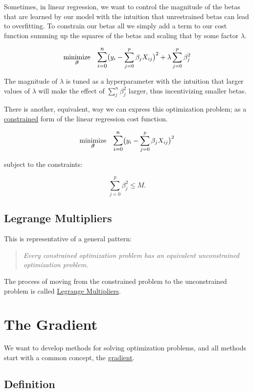 \documentclass[a4paper, 12pt]{article}
\begin{document}
Sometimes, in linear regression, we want to control the magnitude of the betas that are learned by our model with the intuition that unrestrained betas can lead to overfitting. To constrain our betas all we simply add a term to our cost function summing up the squares of the betas and scaling that by some factor $\lambda$.

    $$ \underset{\bm{\beta}}{\text{minimize}} \quad \mathlarger{\sum_{i=0}^n}
       \big(y_i - \sum_{j=0}^p \beta_j X_{ij} \big)^2 + \lambda \sum_{j=0}^p \beta_j^2 $$

The magnitude of $\lambda$ is tuned as a hyperparameter with the intuition that larger values of $\lambda$ will make the effect of $\sum_j^n \beta_j^2$ larger, thus incentivizing smaller betas.

\vspace{1pc}

There is another, equivalent, way we can express this optimization problem; as a \underline{constrained} form of the linear regression cost function.

    $$ \underset{\bm{\beta}}{\text{minimize}} \quad \mathlarger{\sum_{i=0}^n}
       \big(y_i - \sum_{j=0}^p \beta_j X_{ij} \big)^2 $$

\qquad subject to the constraints:

    $$ \sum_{j=0}^p \beta_j^2 \leq M. $$

\subsection*{Legrange Multipliers}
This is representative of a general pattern:

\begin{quote}
  \textit{Every constrained optimization problem has an equivalent unconstrained optimization problem.}
\end{quote}

The process of moving from the constrained problem to the unconstrained problem is called \underline{Legrange Multipliers}.

\section*{The Gradient}

We want to develop methods for solving optimization problems, and all methods start with a common concept, the \underline{gradient}.

\subsection*{Definition}
\end{document}

